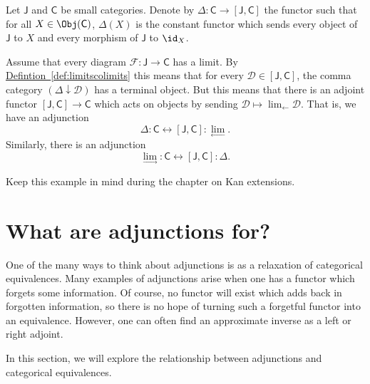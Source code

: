 \documentclass[main.tex]{subfiles}
\begin{document}
\begin{example}
  Let $\mathsf{J}$ and $\mathsf{C}$ be small categories. Denote by $\Delta\colon \mathsf{C} \to [\mathsf{J}, \mathsf{C}]$ the functor such that for all $X \in \Obj(\mathsf{C})$, $\Delta(X)$ is the constant functor which sends every object of $\mathsf{J}$ to $X$ and every morphism of $\mathsf{J}$ to $\id_{X}$.

  Assume that every diagram $\mathcal{F}\colon \mathsf{J} \to \mathsf{C}$ has a limit. By \hyperref[def:limitscolimits]{Defintion~\ref*{def:limitscolimits}} this means that for every $\mathcal{D} \in [\mathsf{J}, \mathsf{C}]$, the comma category $(\Delta \downarrow \mathcal{D})$ has a terminal object. But this means that there is an adjoint functor $[\mathsf{J}, \mathsf{C}] \to \mathsf{C}$ which acts on objects by sending $\mathcal{D} \mapsto \lim_{\leftarrow} \mathcal{D}$. That is, we have an adjunction
  \begin{equation*}
    \Delta : \mathsf{C} \leftrightarrow [\mathsf{J}, \mathsf{C}] : \lim_{\leftarrow}.
  \end{equation*}
  Similarly, there is an adjunction
  \begin{equation*}
    \lim_{\rightarrow} : \mathsf{C} \leftrightarrow [\mathsf{J}, \mathsf{C}] : \Delta.
  \end{equation*}
\end{example}

Keep this example in mind during the chapter on Kan extensions.

\section{What are adjunctions for?}
\label{sec:what_are_adjunctions_for}

One of the many ways to think about adjunctions is as a relaxation of categorical equivalences. Many examples of adjunctions arise when one has a functor which forgets some information. Of course, no functor will exist which adds back in forgotten information, so there is no hope of turning such a forgetful functor into an equivalence. However, one can often find an approximate inverse as a left or right adjoint.

In this section, we will explore the relationship between adjunctions and categorical equivalences.
\end{document}
